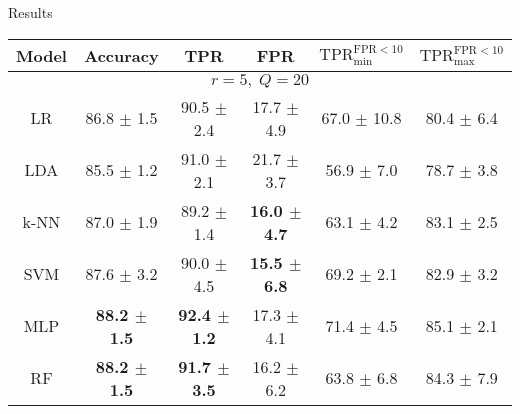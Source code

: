 \begin{frame}{Results}
\begin{table}[ht]
\small
\begin{center}
\begin{tabular}{c c c c c c}
\toprule
  Model     & Accuracy & TPR & FPR & $\text{TPR}_{\text{min}}^{\text{FPR}<10}$ & $\text{TPR}_{\text{max}}^{\text{FPR}<10}$ \\
\midrule
 \multicolumn{6}{c}{\footnotesize $r = 5,\; Q = 20$} \\
\hline
LR   &  86.8 $\pm$ 1.5 & 90.5  $\pm$  2.4 &  17.7  $\pm$  4.9 & 67.0  $\pm$  10.8 & 80.4 $\pm$  6.4 \\
LDA   &  85.5  $\pm$  1.2  & 91.0  $\pm$  2.1 &  21.7  $\pm$  3.7 & 56.9  $\pm$  7.0 & 78.7  $\pm$  3.8 \\
k-NN  &    87.0  $\pm$  1.9 & 89.2  $\pm$  1.4  & \textbf{16.0  $\pm$  4.7} & 63.1  $\pm$  4.2 & 83.1  $\pm$  2.5 \\
SVM  &   87.6  $\pm$  3.2 & 90.0  $\pm$  4.5 & \textbf{15.5  $\pm$  6.8} & 69.2 $\pm$ 2.1 & 82.9  $\pm$  3.2 \\
MLP  &\textbf{88.2  $\pm$  1.5} & \textbf{92.4  $\pm$  1.2} & 17.3  $\pm$  4.1 & 71.4  $\pm$  4.5 & 85.1  $\pm$  2.1\\
RF  & \textbf{88.2  $\pm$  1.5} & \textbf{91.7 $\pm$ 3.5} & 16.2  $\pm$  6.2 & 63.8  $\pm$  6.8 & 84.3  $\pm$  7.9 \\
\bottomrule
\end{tabular}
\end{center}
\end{table}


\end{frame}
